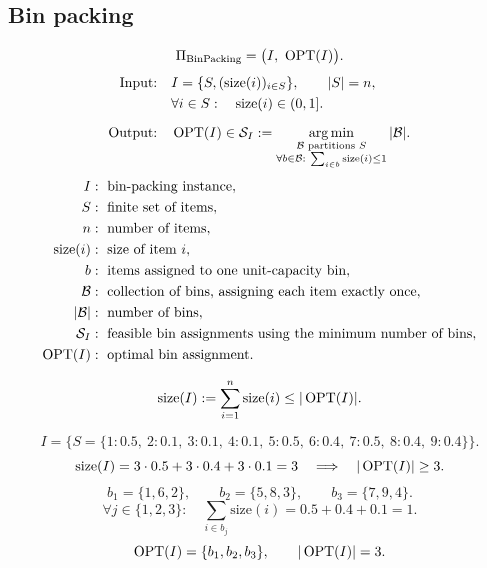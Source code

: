\documentclass[12pt,a4paper]{article}
\begin{document}
\subsection{Bin packing}

\noindent\begin{minipage}{\linewidth}
\begin{definition}
\[
\Pi_{\mathrm{BinPacking}}
=\bigl(I,\ \operatorname{OPT}(I)\bigr).
\]
\[
\begin{aligned}
\text{Input:}\quad&I=\{S,(\mathrm{size}(i))_{i\in S}\},\qquad |S|=n,\\
&\forall i\in S:\quad\mathrm{size}(i)\in(0,1].\\[6pt]
\text{Output:}\quad&\operatorname{OPT}(I)\in\mathcal S_I:=
\operatorname*{arg\,min}_{\substack{\mathcal B\text{ partitions }S\\
\forall b\in\mathcal B:\ \sum_{i\in b}\mathrm{size}(i)\leq1}}
|\mathcal B|.
\end{aligned}
\]
\[
\begin{aligned}
I&:\text{ bin-packing instance},\\
S&:\text{ finite set of items},\\
n&:\text{ number of items},\\
\mathrm{size}(i)&:\text{ size of item }i,\\
b&:\text{ items assigned to one unit-capacity bin},\\
\mathcal B&:\text{ collection of bins, assigning each item exactly once},\\
|\mathcal B|&:\text{ number of bins},\\
\mathcal S_I&:\text{ feasible bin assignments using the minimum number of bins},\\
\operatorname{OPT}(I)&:\text{ optimal bin assignment}.
\end{aligned}
\]
\end{definition}
\end{minipage}\par

\begin{remark}
\[
\mathrm{size}(I):=\sum_{i=1}^n\mathrm{size}(i)\leq|\operatorname{OPT}(I)|.
\]
\end{remark}

\noindent\begin{minipage}{\linewidth}
\begin{example}
\[
I=\{S=\{1:0.5,\ 2:0.1,\ 3:0.1,\ 4:0.1,\ 5:0.5,\ 6:0.4,\
7:0.5,\ 8:0.4,\ 9:0.4\}\}.
\]
\[
\mathrm{size}(I)=3\cdot0.5+3\cdot0.4+3\cdot0.1=3
\quad\Longrightarrow\quad |\operatorname{OPT}(I)|\geq3.
\]
\[
b_1=\{1,6,2\},\qquad b_2=\{5,8,3\},\qquad b_3=\{7,9,4\}.
\]
\[
\forall j\in\{1,2,3\}:\quad
\sum_{i\in b_j}\mathrm{size}(i)=0.5+0.4+0.1=1.
\]
\[
\operatorname{OPT}(I)=\{b_1,b_2,b_3\},\qquad |\operatorname{OPT}(I)|=3.
\]
\end{example}
\end{minipage}\par
\end{document}
